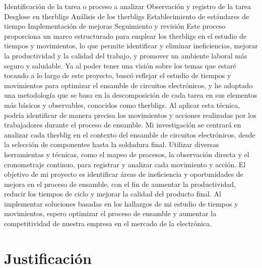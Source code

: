 \begin{itemize}
Identificación de la tarea o proceso a analizar
Observación y registro de la tarea 
Desglose en therbligs
Análisis de los therbligs
Establecimiento de estándares de tiempo 
Implementación de mejoras
Seguimiento y revisión
Este proceso proporciona un marco estructurado para emplear los therbligs en el estudio de tiempos y movimientos, lo que permite identificar y eliminar ineficiencias, mejorar la productividad y la calidad del trabajo, y promover un ambiente laboral más seguro y saludable.
Ya al poder tener una visión sobre los temas que estaré tocando a lo largo de este proyecto, buscó reflejar el estudio de tiempos y movimientos para optimizar el ensamble de circuitos electrónicos, y he adoptado una metodología que se basa en la descomposición de cada tarea en sus elementos más básicos y observables, conocidos como therbligs. Al aplicar esta técnica, podría identificar de manera precisa los movimientos y acciones realizadas por los trabajadores durante el proceso de ensamble.
Mi investigación se centrará en analizar cada therblig en el contexto del ensamble de circuitos electrónicos, desde la selección de componentes hasta la soldadura final. Utilizar diversas herramientas y técnicas, como el mapeo de procesos, la observación directa y el cronometraje continuo, para registrar y analizar cada movimiento y acción.
El objetivo de mi proyecto es identificar áreas de ineficiencia y oportunidades de mejora en el proceso de ensamble, con el fin de aumentar la productividad, reducir los tiempos de ciclo y mejorar la calidad del producto final. Al implementar soluciones basadas en los hallazgos de mi estudio de tiempos y movimientos, espero optimizar el proceso de ensamble y aumentar la competitividad de nuestra empresa en el mercado de la electrónica.
\end{itemize}
% 
% 
\section{Justificación}

